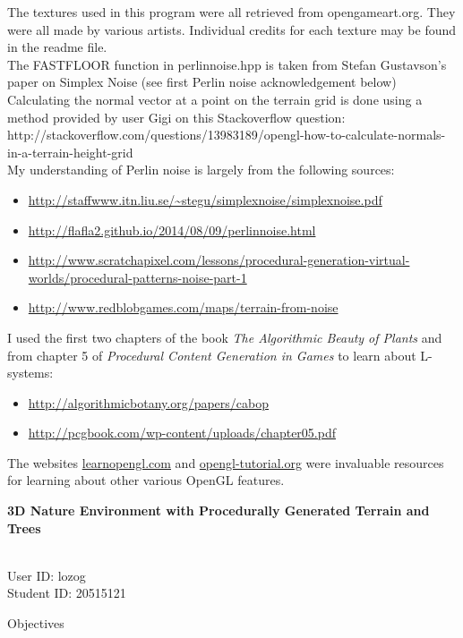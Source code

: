 \documentclass{article}
\newcommand\projecttitle{3D Nature Environment with Procedurally Generated Terrain and Trees}
\newcommand\myname{Liam Ozog}
\newcommand\myuserid{lozog}
\newcommand\mystudentid{20515121}
\begin{document}
The textures used in this program were all retrieved from opengameart.org. They were all made by various artists. Individual credits for each texture may be found in the readme file.
\\

The FASTFLOOR function in perlinnoise.hpp is taken from Stefan Gustavson's paper on Simplex Noise (see first Perlin noise acknowledgement below)
\\

Calculating the normal vector at a point on the terrain grid is done using a method provided by user Gigi
 on this Stackoverflow question: http://stackoverflow.com/questions/13983189/opengl-how-to-calculate-normals-in-a-terrain-height-grid
\\

My understanding of Perlin noise is largely from the following sources:
\begin{itemize}
\item \url{http://staffwww.itn.liu.se/~stegu/simplexnoise/simplexnoise.pdf}
\item \url{http://flafla2.github.io/2014/08/09/perlinnoise.html}
\item \url{http://www.scratchapixel.com/lessons/procedural-generation-virtual-worlds/procedural-patterns-noise-part-1}
\item \url{http://www.redblobgames.com/maps/terrain-from-noise}
\end{itemize}


I used the first two chapters of the book \textit{The Algorithmic Beauty of Plants} and from chapter 5 of \textit{Procedural Content Generation in Games} to learn about L-systems:
\begin{itemize}
\item \url{http://algorithmicbotany.org/papers/cabop}
\item \url{http://pcgbook.com/wp-content/uploads/chapter05.pdf}
\end{itemize}


The websites \url{learnopengl.com} and \url{opengl-tutorial.org} were invaluable resources for learning about other various OpenGL features.

\newpage

{\noindent \huge \bf 
	\projecttitle 
}

\medskip
\noindent{Name: \myname} \\ 
User ID: \myuserid \\ 
Student ID: \mystudentid 

\bigskip
{\noindent\Large Objectives}
\end{document}
